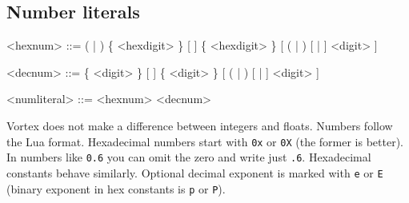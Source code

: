 \documentclass{article}
\newenvironment{bnf}
{
\begin{mdframed}
\begin{grammar}
}
{
\end{grammar}
\end{mdframed}
}
\begin{document}
\subsection{Number literals}
\begin{bnf}
<hexnum> ::= ( | ) \{ <hexdigit> \} [  ]
    \{ <hexdigit> \} [ ( | ) [ \lit{+} | \lit{-} ] <digit> ]

<decnum> ::= \{ <digit> \} [  ] \{ <digit> \} [ ( | )
    [ \lit{+} | \lit{-} ] <digit> ]

<numliteral> ::= <hexnum>
    \alt <decnum>
\end{bnf}
Vortex does not make a difference between integers and floats. Numbers follow
the Lua format. Hexadecimal numbers start with \verb|0x| or \verb|0X| (the
former is better). In numbers like \verb|0.6| you can omit the zero and write
just \verb|.6|. Hexadecimal constants behave similarly. Optional decimal
exponent is marked with \verb|e| or \verb|E| (binary exponent in hex constants
is \verb|p| or \verb|P|).
\end{document}
